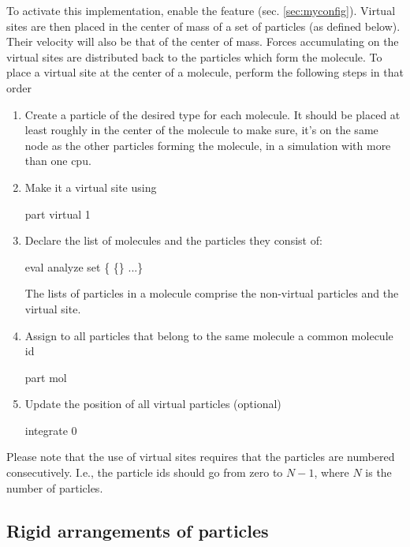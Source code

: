 To activate this implementation, enable the feature
 (sec. \ref{sec:myconfig}).  Virtual sites
are then placed in the center of mass of a set of particles (as
defined below). Their velocity will also be that of the center of
mass. Forces accumulating on the virtual sites are distributed back to
the particles which form the molecule.  To place a virtual site at the
center of a molecule, perform the following steps in that order
\begin{enumerate}
\item Create a particle of the desired type for each molecule. It
  should be placed at least roughly in the center of the molecule to
  make sure, it's on the same node as the other particles forming the
  molecule, in a simulation with more than one cpu.
\item Make it a virtual site using 
  \begin{essyntaxbox}
    part  virtual 1
  \end{essyntaxbox}
\item Declare the list of molecules and the particles they consist of:
  \begin{essyntaxbox}
    eval analyze set \{ \{\} ...\}
  \end{essyntaxbox}
  The lists of particles in a molecule comprise the non-virtual
  particles and the virtual site.
\item Assign to all particles that belong to the same molecule a
  common molecule id
  \begin{essyntaxbox}
    part  mol 
  \end{essyntaxbox}
\item Update the position of all virtual particles (optional)
  \begin{essyntaxbox}
    integrate 0
  \end{essyntaxbox}
\end{enumerate}
Please note that the use of virtual sites requires that the particles are numbered consecutively. I.e., the particle ids should go from zero to $N-1$, where $N$ is the number of particles.


\subsection{Rigid arrangements of particles}


